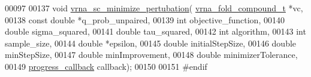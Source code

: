 \begin{DoxyCode}
00097 
00137 \textcolor{keywordtype}{void} \hyperlink{group__perturbation_gaa124bdc20d88001c38ade590c4bcc3c4}{vrna\_sc\_minimize\_pertubation}(
      \hyperlink{group__fold__compound_structvrna__fc__s}{vrna\_fold\_compound\_t} *vc,
00138                                   \textcolor{keyword}{const} \textcolor{keywordtype}{double} *q\_prob\_unpaired,
00139                                   \textcolor{keywordtype}{int} objective\_function,
00140                                   \textcolor{keywordtype}{double} sigma\_squared,
00141                                   \textcolor{keywordtype}{double} tau\_squared,
00142                                   \textcolor{keywordtype}{int} algorithm,
00143                                   \textcolor{keywordtype}{int} sample\_size,
00144                                   \textcolor{keywordtype}{double} *epsilon,
00145                                   \textcolor{keywordtype}{double} initialStepSize,
00146                                   \textcolor{keywordtype}{double} minStepSize,
00147                                   \textcolor{keywordtype}{double} minImprovement,
00148                                   \textcolor{keywordtype}{double} minimizerTolerance,
00149                                   \hyperlink{group__perturbation_gaa715397c7afd2d2955c315512a3d571a}{progress\_callback} callback);
00150 
00151 \textcolor{preprocessor}{#endif}
\end{DoxyCode}

